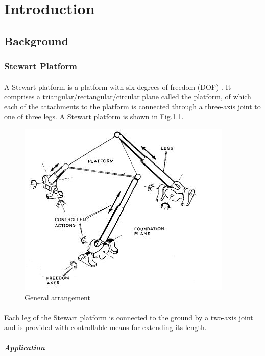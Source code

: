 \section{Introduction}
\label{sec:introduction}
\subsection{Background}
\subsubsection{Stewart Platform}
\paragraph{}A Stewart platform is a platform with six degrees of freedom (DOF)
\cite{stewart1965platform}. It comprises a triangular/rectangular/circular plane called the platform, of which each of the attachments to the platform is connected through a three-axis joint to one of three legs.
A Stewart platform is shown in Fig.1.1.
\begin{center}
	\begin{figure}[!h]
	\centering
	\includegraphics{Figures/Fig1}
	\caption{General arrangement}
	\end{figure}
\end{center}
\paragraph{}Each leg of the Stewart platform is connected to the ground by a two-axis joint and is provided with controllable means for extending its length.
\subparagraph{Application}
